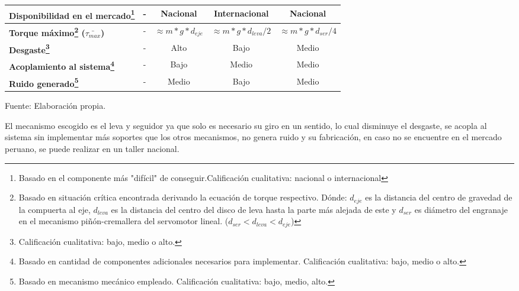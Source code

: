 \begin{itemize}
\begin{savenotes}
\begin{mytable}[H]
\begin{tabular}{l|c|c|c|c|}
{\begin{minipage}{\myforthmaxsizeofcontenttable}
					\textbf{Disponibilidad en el mercado\footnote{Basado en el componente más "difícil" de conseguir.Calificación cualitativa: nacional o internacional}}
				\end{minipage}
			} & - & Nacional & Internacional & Nacional \\ \hline
			\multicolumn{1}{|l|}{
				\begin{minipage}{\myforthmaxsizeofcontenttable}			
					\textbf{Torque máximo\footnote{Basado en situación crítica encontrada derivando la ecuación de torque respectivo. Dónde: $d_{eje}$ es la distancia del centro de gravedad de la compuerta al eje, $d_{leva}$ es la distancia del centro del disco de leva hasta la parte más alejada de este y $d_{ser}$ es diámetro del engranaje en el mecanismo piñón-cremallera del servomotor lineal. ($d_{ser}<d_{leva}<d_{eje}$)} ($\bar{\tau_{max}}$)}
				\end{minipage}
			} & - & $\approx m*g*d_{eje}$ & $\approx m*g*d_{leva}/2$ & $\approx m*g*d_{ser}/4$ \\ \hline
		 	\multicolumn{1}{|l|}{
				\begin{minipage}{\myforthmaxsizeofcontenttable}			
					\textbf{Desgaste\footnote{Calificación cualitativa: bajo, medio o alto.}}
				\end{minipage}
			} & - & Alto & Bajo & Medio \\ \hline
			\multicolumn{1}{|l|}{
				\begin{minipage}{\myforthmaxsizeofcontenttable}			
					\textbf{Acoplamiento al sistema\footnote{Basado en cantidad de componentes adicionales necesarios para implementar. Calificación cualitativa: bajo, medio o alto.}}
				\end{minipage}
			} & - & Bajo & Medio & Medio \\ \hline
			\multicolumn{1}{|l|}{
				\begin{minipage}{\myforthmaxsizeofcontenttable}			
					\textbf{Ruido generado\footnote{Basado en mecanismo mecánico empleado. Calificación cualitativa: bajo, medio, alto.}}
				\end{minipage}
			} & - & Medio & Bajo & Medio \\ \hline
			\end{tabular}
		\begin{flushleft}	
			Fuente: Elaboración propia.
		\end{flushleft}
	\end{mytable}
	\end{savenotes}	
	
	El mecanismo escogido es el leva y seguidor ya que solo es necesario su giro en un sentido, lo cual disminuye el desgaste, se acopla al sistema sin implementar más soportes que los otros mecanismos, no genera ruido y su fabricación, en caso no se encuentre en el mercado peruano, se puede realizar en un taller nacional.  	
	

\end{itemize}
